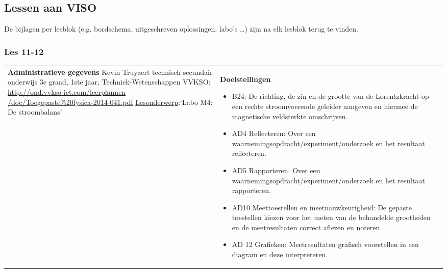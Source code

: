 


\begin{landscape}
	\subsection{Lessen aan VISO}\vspace*{-5mm}
	De bijlagen per lesblok (e.g. bordschema, uitgeschreven oplossingen, labo's \ldots) zijn na elk lesblok terug te vinden. \vspace*{-15mm}
	\subsubsection{Les 11-12}\vspace*{-5mm}
	\begin{tabularx}{1.56\textwidth}{|p{}|X|}\hline
		\textbf{Administratieve gegevens}\newline\newline
		Kevin Truyaert\newline\newline
		technisch secundair onderwijs\newline
		3e graad, 1ste jaar, Techniek-Wetenschappen\newline
		VVKSO: \href{http://ond.vvkso-ict.com/leerplannen/doc/Toegepaste\%20fysica-2014-041.pdf}{http://ond.vvkso-ict.com/leerplannen /doc/Toegepaste\%20fysica-2014-041.pdf} \newline
		\underline{Lesonderwerp}:\newline `Labo M4: De stroombalans' & \textbf{Doelstellingen}
		\begin{itemize}[itemsep=0.08\baselineskip]
			\item B24: De richting, de zin en de grootte van de Lorentzkracht op een rechte stroomvoerende geleider aangeven en hiermee de magnetische veldsterkte omschrijven. 
			\item AD4 Reflecteren: Over een waarnemingsopdracht/experiment/onderzoek en het resultaat reflecteren.
			\item AD5 Rapporteren: Over een waarnemingsopdracht/experiment/onderzoek en het resultaat rapporteren.
			\item AD10 Meettoestellen en meetnauwkeurigheid: De gepaste toestellen kiezen voor het meten van de behandelde grootheden en de meetresultaten correct aflezen en noteren.
			\item AD 12 Grafieken: Meetresultaten grafisch voorstellen in een diagram en deze interpreteren.

\end{itemize}
\end{tabularx}
\end{landscape}
